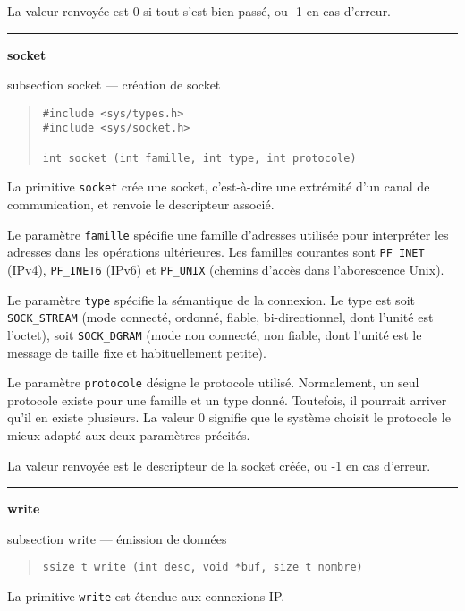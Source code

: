 \documentclass [twoside] {report}
\newcommand {\primitive} [1]
    {
	{\large \bf #1}
	\addcontentsline {toc} {subsection} {#1}
    }
\newcommand {\separation}
    {
	\vspace {7mm}
	\nopagebreak
	\hrule
    }
\begin{document}
La valeur renvoyée est 0 si tout s'est bien passé, ou -1 en
cas d'erreur.



\separation
\primitive {socket} --- création de socket

\begin {quote}
\begin {verbatim}
#include <sys/types.h>
#include <sys/socket.h>

int socket (int famille, int type, int protocole)
\end{verbatim}
\end {quote}

La primitive {\tt socket} crée une socket, c'est-à-dire
une extrémité d'un canal de communication, et renvoie le
descripteur associé.

Le paramètre {\tt famille} spécifie une famille d'adresses utilisée
pour interpréter les adresses dans les opérations ultérieures. Les
familles courantes sont {\tt PF\_INET} (IPv4), \texttt {PF\_INET6}
(IPv6) et {\tt PF\_UNIX} (chemins d'accès dans l'aborescence Unix).

Le paramètre {\tt type} spécifie la sémantique de la
connexion. Le type est soit {\tt SOCK\_STREAM} (mode
connecté, ordonné, fiable, bi-directionnel, dont l'unité est
l'octet), soit {\tt SOCK\_DGRAM} (mode non connecté, non
fiable, dont l'unité est le message de taille fixe et
habituellement petite).

Le paramètre {\tt protocole} désigne le protocole utilisé.
Normalement, un seul protocole existe pour une famille et un
type donné. Toutefois, il pourrait arriver qu'il en existe
plusieurs. La valeur 0 signifie que le système choisit le
protocole le mieux adapté aux deux paramètres précités.

La valeur renvoyée est le descripteur de la socket créée, ou
-1 en cas d'erreur.



\separation
\primitive {write} --- émission de données

\begin {quote}
\begin {verbatim}
ssize_t write (int desc, void *buf, size_t nombre)
\end{verbatim}
\end {quote}

La primitive {\tt write} est étendue aux connexions IP.

\end{document}

